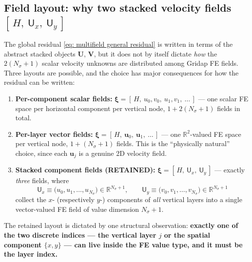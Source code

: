 \documentclass{article}
\newcommand{\Ns}{N_\sigma}
\newcommand{\uj}{\mathbf{u}_j}
\begin{document}
\subsection*{Field layout: why two stacked velocity fields $[\,H,\ \mathsf{U}_x,\ \mathsf{U}_y\,]$}

The global residual \eqref{eq: multifield general residual} is written in terms of the abstract stacked objects $\mathbf{U}$, $\mathbf{V}$, but it does not by itself dictate \emph{how} the $2(\Ns+1)$ scalar velocity unknowns are distributed among Gridap FE fields. Three layouts are possible, and the choice has major consequences for how the residual can be written:

\begin{enumerate}
    \item \textbf{Per-component scalar fields:} $\boldsymbol{\xi} = [\,H,\ u_0, v_0,\ u_1, v_1,\ \dots\,]$ — one scalar FE space per horizontal component per vertical node, $1 + 2(\Ns+1)$ fields in total.
    \item \textbf{Per-layer vector fields:} $\boldsymbol{\xi} = [\,H,\ \mathbf{u}_0,\ \mathbf{u}_1,\ \dots\,]$ — one $\mathbb{R}^2$-valued FE space per vertical node, $1 + (\Ns+1)$ fields. This is the ``physically natural'' choice, since each $\uj$ is a genuine 2D velocity field.
    \item \textbf{Stacked component fields (RETAINED):} $\boldsymbol{\xi} = [\,H,\ \mathsf{U}_x,\ \mathsf{U}_y\,]$ — exactly \emph{three} fields, where
    $$\mathsf{U}_x \equiv \big(u_0, u_1, \dots, u_{\Ns}\big) \in \mathbb{R}^{\Ns+1}, \qquad \mathsf{U}_y \equiv \big(v_0, v_1, \dots, v_{\Ns}\big) \in \mathbb{R}^{\Ns+1}$$
    collect the $x$- (respectively $y$-) components of \emph{all} vertical layers into a single vector-valued FE field of value dimension $\Ns+1$.
\end{enumerate}

The retained layout is dictated by one structural observation: \textbf{exactly one of the two discrete indices — the vertical layer $j$ or the spatial component $\{x,y\}$ — can live inside the FE value type, and it must be the layer index.}
\end{document}

